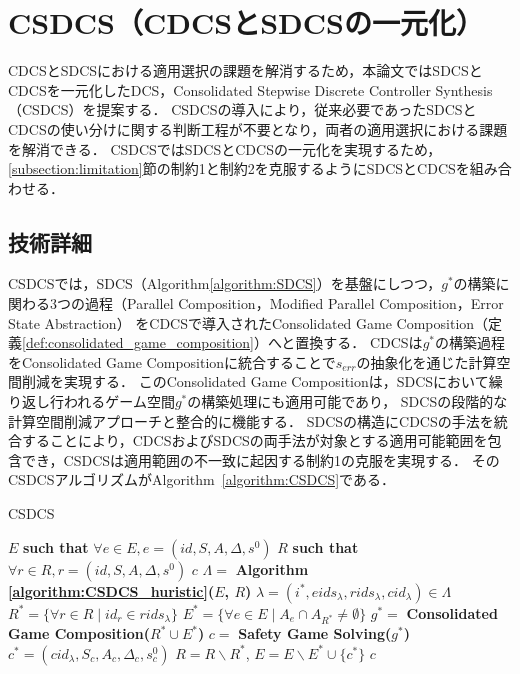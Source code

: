 \section{CSDCS（CDCSとSDCSの一元化）}
\label{section:proposal}
CDCSとSDCSにおける適用選択の課題を解消するため，本論文ではSDCSとCDCSを一元化したDCS，Consolidated Stepwise Discrete Controller Synthesis（CSDCS）を提案する．
CSDCSの導入により，従来必要であったSDCSとCDCSの使い分けに関する判断工程が不要となり，両者の適用選択における課題を解消できる．
CSDCSではSDCSとCDCSの一元化を実現するため，\ref{subsection:limitation}節の制約1と制約2を克服するようにSDCSとCDCSを組み合わせる．

\subsection{技術詳細}
CSDCSでは，SDCS（Algorithm\ref{algorithm:SDCS}）を基盤にしつつ，$g^{*}$の構築に関わる3つの過程（Parallel Composition，Modified Parallel Composition，Error State Abstraction）
をCDCSで導入されたConsolidated Game Composition（定義\ref{def:consolidated_game_composition}）へと置換する．
CDCSは$g^{*}$の構築過程をConsolidated Game Compositionに統合することで$s_{err}$の抽象化を通じた計算空間削減を実現する．
このConsolidated Game Compositionは，SDCSにおいて繰り返し行われるゲーム空間$g^{*}$の構築処理にも適用可能であり，
SDCSの段階的な計算空間削減アプローチと整合的に機能する．
SDCSの構造にCDCSの手法を統合することにより，CDCSおよびSDCSの両手法が対象とする適用可能範囲を包含でき，CSDCSは適用範囲の不一致に起因する制約1の克服を実現する．
そのCSDCSアルゴリズムがAlgorithm~\ref{algorithm:CSDCS}である．

\begin{algorithm}[h]
\caption{CSDCS}
\label{algorithm:CSDCS}
\begin{algorithmic}[1]
\renewcommand{\algorithmicrequire}{\textbf{Input:}}
\renewcommand{\algorithmicensure}{\textbf{Output:}}
\REQUIRE $E$ {\bf such that} $\forall e \in E, e = (id, S, A, \Delta, s^0)$
\REQUIRE $R$ {\bf such that} $\forall r \in R, r = (id, S, A, \Delta, s^0)$
\ENSURE $c$
\STATE $\Lambda =$ {\bf Algorithm \ref{algorithm:CSDCS_huristic}($E$, $R$)}
    \STATE $\lambda = (i^*, eids_{\lambda}, rids_{\lambda}, cid_{\lambda}) \in \Lambda$
    \STATE $R^* = \{\forall r \in R \mid id_{r} \in rids_{\lambda}\}$
    \STATE $E^* = \{\forall e \in E \mid A_{e} \cap A_{R^*} \neq \emptyset\}$
    \STATE $g^* =$ {\bf Consolidated Game Composition($R^* \cup E^*$)}
    \STATE $c   =$ {\bf Safety Game Solving($g^*$)}
    \STATE $c^* = (cid_{\lambda}, S_{c}, A_{c}, \Delta_{c}, s^0_{c})$
    \STATE $R   = R \backslash R^*$, $E = E \backslash E^* \cup \{c^*\}$
\ENDFOR
{} $c$
\end{algorithmic}
\end{algorithm}

